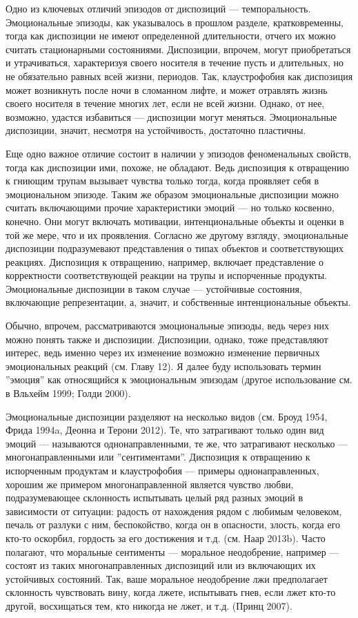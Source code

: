 \documentclass[11pt]{book}
\begin{document}
Одно из ключевых отличий эпизодов от диспозиций --- темпоральность. Эмоциональные эпизоды, как указывалось в прошлом разделе, кратковременны, тогда как диспозиции не имеют определенной длительности, отчего их можно считать стационарными состояниями. Диспозиции, впрочем, могут приобретаться и утрачиваться, характеризуя своего носителя в течение пусть и длительных, но не обязательно равных всей жизни, периодов. Так, клаустрофобия как диспозиция может возникнуть после ночи в сломанном лифте, и может отравлять жизнь своего носителя в течение многих лет, если не всей жизни. Однако, от нее, возможно, удастся избавиться --- диспозиции могут меняться. Эмоциональные диспозиции, значит, несмотря на устойчивость, достаточно пластичны.

Еще одно важное отличие состоит в наличии у эпизодов феноменальных свойств, тогда как диспозиции ими, похоже, не обладают. Ведь диспозиция к отвращению к гниющим трупам вызывает чувства только тогда, когда проявляет себя в эмоциональном эпизоде. Таким же образом эмоциональные диспозиции можно считать включающими прочие характеристики эмоций --- но только косвенно, конечно. Они могут включать мотивации, интенциональные объекты и оценки в той же мере, что и их проявления. Согласно же другому взгляду, эмоциональные диспозиции подразумевают представления о типах объектов и соответствующих реакциях. Диспозиция к отвращению, например, включает представление о корректности соответствующей реакции на трупы и испорченные продукты. Эмоциональные диспозиции в таком случае --- устойчивые состояния, включающие репрезентации, а, значит, и собственные интенциональные объекты.

Обычно, впрочем, рассматриваются эмоциональные эпизоды, ведь через них можно понять также и диспозиции. Диспозиции, однако, тоже представляют интерес, ведь именно через их изменение возможно изменение первичных эмоциональных реакций (см. Главу 12). Я далее буду использовать термин ''эмоция'' как относящийся к эмоциональным эпизодам (другое использование см. в Вльхейм 1999; Голди 2000).

Эмоциональные диспозиции разделяют на несколько видов (см. Броуд 1954, Фрида 1994a, Деонна и Терони 2012). Те, что затрагивают только один вид эмоций --- называются однонаправленными, те же, что затрагивают несколько --- многонаправленными или ''сентиментами''. Диспозиция к отвращению к испорченным продуктам и клаустрофобия --- примеры однонаправленных, хорошим же примером многонаправленной является чувство любви, подразумевающее склонность испытывать целый ряд разных эмоций в зависимости от ситуации: радость от нахождения рядом с любимым человеком, печаль от разлуки с ним, беспокойство, когда он в опасности, злость, когда его кто-то оскорбил, гордость за его достижения и т.д. (см. Наар 2013b). Часто полагают, что моральные сентименты --- моральное неодобрение, например --- состоят из таких многонаправленных диспозиций или из включающих их устойчивых состояний. Так, ваше моральное неодобрение лжи предполагает склонность чувствовать вину, когда лжете, испытывать гнев, если лжет кто-то другой, восхищаться тем, кто никогда не лжет, и т.д. (Принц 2007).
\end{document}
